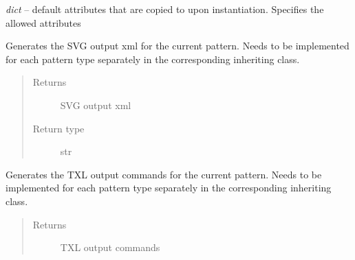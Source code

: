 \documentclass[letterpaper,10pt,english]{sphinxmanual}
\begin{document}
\begin{fulllineitems}
\begin{fulllineitems}
\end{fulllineitems}


\begin{fulllineitems}
\label{Chapters/PythonModuleReference/Patterns/TXLWizard.Patterns.AbstractPattern:TXLWizard.Patterns.AbstractPattern.AbstractPattern.DefaultAttributes}
\emph{dict} -- default attributes that are copied to  upon instantiation. Specifies the allowed attributes

\end{fulllineitems}


\begin{fulllineitems}
\label{Chapters/PythonModuleReference/Patterns/TXLWizard.Patterns.AbstractPattern:TXLWizard.Patterns.AbstractPattern.AbstractPattern.GetSVGOutput}
Generates the SVG output xml for the current pattern.
Needs to be implemented for each pattern type separately in the corresponding inheriting class.
\begin{quote}\begin{description}
\item[{Returns}] \leavevmode
SVG output xml

\item[{Return type}] \leavevmode
str

\end{description}\end{quote}

\end{fulllineitems}


\begin{fulllineitems}
\label{Chapters/PythonModuleReference/Patterns/TXLWizard.Patterns.AbstractPattern:TXLWizard.Patterns.AbstractPattern.AbstractPattern.GetTXLOutput}
Generates the TXL output commands for the current pattern.
Needs to be implemented for each pattern type separately in the corresponding inheriting class.
\begin{quote}\begin{description}
\item[{Returns}] \leavevmode
TXL output commands


\end{description}
\end{quote}
\end{fulllineitems}
\end{fulllineitems}
\end{document}
